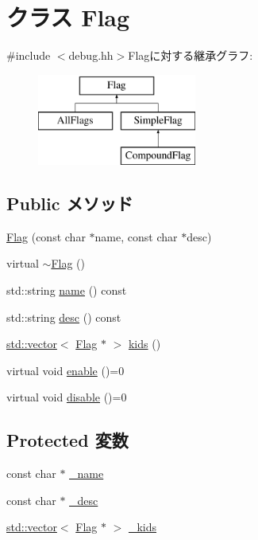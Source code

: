 \hypertarget{classDebug_1_1Flag}{
\section{クラス Flag}
\label{classDebug_1_1Flag}
}


{\ttfamily \#include $<$debug.hh$>$}Flagに対する継承グラフ:\begin{figure}[H]
\begin{center}
\leavevmode
\includegraphics[height=3cm]{classDebug_1_1Flag}
\end{center}
\end{figure}
\subsection*{Public メソッド}
\begin{DoxyCompactItemize}
\item 
\hyperlink{classDebug_1_1Flag_a11f52f24efc3fb0429e0a704e8673ba4}{Flag} (const char $\ast$name, const char $\ast$desc)
\item 
virtual \hyperlink{classDebug_1_1Flag_aa8e6bebe8bd3bd3cfd34256964c048ca}{$\sim$Flag} ()
\item 
std::string \hyperlink{classDebug_1_1Flag_a37627d5d5bba7f4a8690c71c2ab3cb07}{name} () const 
\item 
std::string \hyperlink{classDebug_1_1Flag_a4d78734376449f458cadb533cab6290f}{desc} () const 
\item 
\hyperlink{classstd_1_1vector}{std::vector}$<$ \hyperlink{classDebug_1_1Flag}{Flag} $\ast$ $>$ \hyperlink{classDebug_1_1Flag_af0576ea1093429654e13aa2c3df88c75}{kids} ()
\item 
virtual void \hyperlink{classDebug_1_1Flag_ad1c349e10e4417179f5eb3cb519670b5}{enable} ()=0
\item 
virtual void \hyperlink{classDebug_1_1Flag_ac79a817a699d8fb54e52bf6895db1b0d}{disable} ()=0
\end{DoxyCompactItemize}
\subsection*{Protected 変数}
\begin{DoxyCompactItemize}
\item 
const char $\ast$ \hyperlink{classDebug_1_1Flag_aa1e4a2a162e6a7cc058b96cea960135f}{\_\-name}
\item 
const char $\ast$ \hyperlink{classDebug_1_1Flag_a60e3e00f42fae1b70b695597f995b2c8}{\_\-desc}
\item 
\hyperlink{classstd_1_1vector}{std::vector}$<$ \hyperlink{classDebug_1_1Flag}{Flag} $\ast$ $>$ \hyperlink{classDebug_1_1Flag_a1b28d3bf67f3b06a88ecd9ac7b0a7ec9}{\_\-kids}
\end{DoxyCompactItemize}


